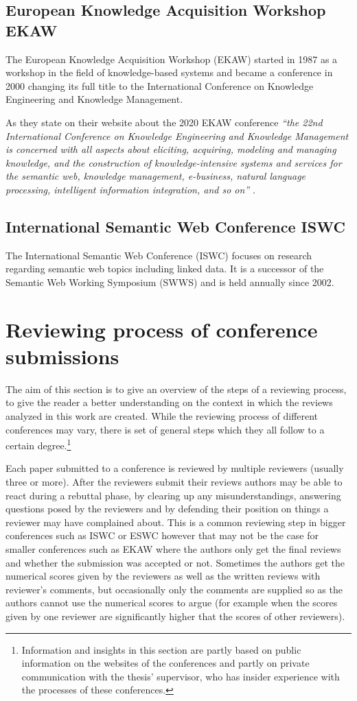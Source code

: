 \subsection{European Knowledge Acquisition Workshop EKAW}
The European Knowledge Acquisition Workshop (EKAW) started in 1987 as a workshop in the field of knowledge-based systems and became a conference in 2000 changing its full title to the International Conference on Knowledge Engineering and Knowledge Management. \cite{ekaw}

As they state on their website about the 2020 EKAW conference \textit{``the 22nd International Conference on Knowledge Engineering and Knowledge Management is concerned with all aspects about eliciting, acquiring, modeling and managing knowledge, and the construction of knowledge-intensive systems and services for the semantic web, knowledge management, e-business, natural language processing, intelligent information integration, and so on''} \cite{ekaw_2020}.
\subsection{International Semantic Web Conference ISWC}
The International Semantic Web Conference (ISWC) focuses on research regarding semantic web topics including linked data. It is a successor of the Semantic Web Working Symposium (SWWS) and is held annually since 2002. \cite{iswc}


\section{Reviewing process of conference submissions}
The aim of this section is to give an overview of the steps of a reviewing process, to give the reader a better understanding on the context in which the reviews analyzed in this work are created.
While the reviewing process of different conferences may vary, there is set of general steps which they all follow to a certain degree.\footnote{Information and insights in this section are partly based on public information on the websites of the conferences and partly on private communication with the thesis’ supervisor, who has insider experience with the processes of these conferences.}

Each paper submitted to a conference is reviewed by multiple reviewers (usually three or more). After the reviewers submit their reviews authors may be able to react during a rebuttal phase, by clearing up any misunderstandings, answering questions posed by the reviewers and by defending their position on things a reviewer may have complained about. This is a common reviewing step in bigger conferences such as ISWC or ESWC however that may not be the case for smaller conferences such as EKAW where the authors only get the final reviews and whether the submission was accepted or not. Sometimes the authors get the numerical scores given by the reviewers as well as the written reviews with reviewer's comments, but occasionally only the comments are supplied so as the authors cannot use the numerical scores to argue (for example when the scores given by one reviewer are significantly higher that the scores of other reviewers).

